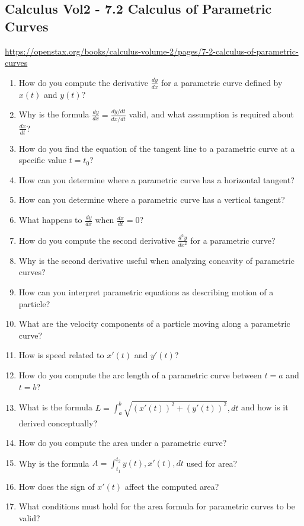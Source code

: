 \subsection{Calculus Vol2 - 7.2 Calculus of Parametric Curves}

\url{https://openstax.org/books/calculus-volume-2/pages/7-2-calculus-of-parametric-curves}

\begin{enumerate}
  \item How do you compute the derivative \(\frac{dy}{dx}\) for a parametric curve defined by \(x(t)\) and \(y(t)\)?
  \item Why is the formula \(\frac{dy}{dx}= \frac{dy/dt}{dx/dt}\) valid, and what assumption is required about \(\frac{dx}{dt}\)?
  \item How do you find the equation of the tangent line to a parametric curve at a specific value \(t=t_{0}\)?
  \item How can you determine where a parametric curve has a horizontal tangent?
  \item How can you determine where a parametric curve has a vertical tangent?
  \item What happens to \(\frac{dy}{dx}\) when \(\frac{dx}{dt}= 0\)?
  \item How do you compute the second derivative \(\frac{d^{2} y}{dx^{2}}\) for a parametric curve?
  \item Why is the second derivative useful when analyzing concavity of parametric curves?
  \item How can you interpret parametric equations as describing motion of a particle?
  \item What are the velocity components of a particle moving along a parametric curve?
  \item How is speed related to \(x'(t)\) and \(y'(t)\)?
  \item How do you compute the arc length of a parametric curve between \(t=a\) and \(t=b\)?
  \item What is the formula \(L = \int_{a}^{b} \sqrt{(x'(t))^{2} + (y'(t))^{2}},dt\) and how is it derived conceptually?
  \item How do you compute the area under a parametric curve?
  \item Why is the formula \(A = \int_{t_{1}}^{t_{2}}y(t),x'(t),dt\) used for area?
  \item How does the sign of \(x'(t)\) affect the computed area?
  \item What conditions must hold for the area formula for parametric curves to be valid?

\end{enumerate}
